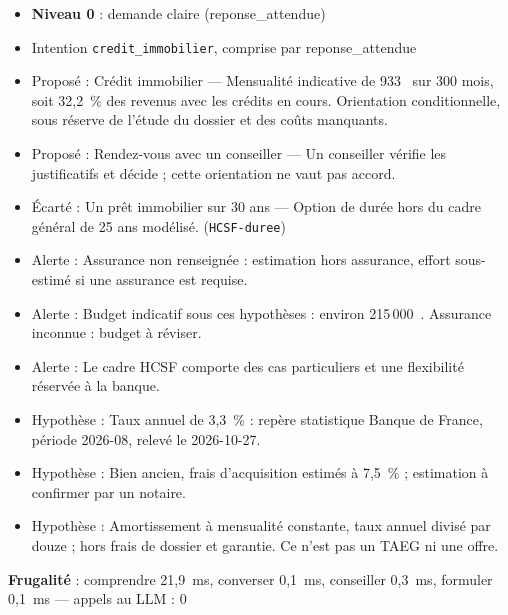\documentclass[11pt,a4paper]{article}
\newcommand{\frugal}[1]{{\scriptsize\color{darkgray}\textbf{Frugalité} : #1}\par\medskip}
\begin{document}
\begin{pourquoi}
\begin{itemize}
\item \textbf{Niveau 0} : demande claire (reponse\_attendue)
\item Intention \texttt{credit\_immobilier}, comprise par reponse\_attendue
\item Proposé : Crédit immobilier --- Mensualité indicative de 933~\texteuro{} sur 300 mois, soit 32,2~\% des revenus avec les crédits en cours. Orientation conditionnelle, sous réserve de l'étude du dossier et des coûts manquants.
\item Proposé : Rendez-vous avec un conseiller --- Un conseiller vérifie les justificatifs et décide ; cette orientation ne vaut pas accord.
\item Écarté : Un prêt immobilier sur 30 ans --- Option de durée hors du cadre général de 25 ans modélisé. (\texttt{HCSF-duree})
\item Alerte : Assurance non renseignée : estimation hors assurance, effort sous-estimé si une assurance est requise.
\item Alerte : Budget indicatif sous ces hypothèses : environ 215\,000~\texteuro{}. Assurance inconnue : budget à réviser.
\item Alerte : Le cadre HCSF comporte des cas particuliers et une flexibilité réservée à la banque.
\item Hypothèse : Taux annuel de 3,3~\% : repère statistique Banque de France, période 2026-08, relevé le 2026-10-27.
\item Hypothèse : Bien ancien, frais d'acquisition estimés à 7,5~\% ; estimation à confirmer par un notaire.
\item Hypothèse : Amortissement à mensualité constante, taux annuel divisé par douze ; hors frais de dossier et garantie. Ce n'est pas un TAEG ni une offre.
\end{itemize}
\end{pourquoi}
\frugal{comprendre 21,9~ms, converser 0,1~ms, conseiller 0,3~ms, formuler 0,1~ms --- appels au LLM : 0}
\end{document}
